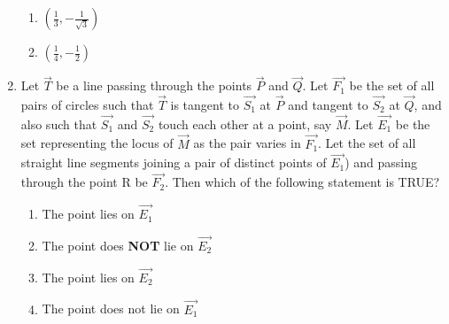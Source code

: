 \documentclass[journal,12pt,twocolumn]{IEEEtran}
\theoremstyle{remark}
\begin{document}
\begin{enumerate}
\begin{enumerate}[label=(\alph*)]
\item $\left(\frac{1}{3}, -\frac{1}{\sqrt{3}} \right)$
\item $\left(\frac{1}{4}, -\frac{1}{2}\right)$
\end{enumerate}
\item Let $\vec{T}$ be a line passing through the points $\vec{P}$ and $\vec{Q}$. Let $\vec{F_1}$ be the set of all pairs of circles  such that $\vec{T}$ is tangent to $\vec{S_1}$ at $\vec{P}$ and tangent to $\vec{S_2}$ at $\vec{Q}$, and also such that $\vec{S_1}$ and $\vec{S_2}$ touch each other at a point, say $\vec{M}$. Let $\vec{E_1}$ be the set representing the locus of $\vec{M}$ as the pair  varies in $\vec{F_1}$. Let the set of all straight line segments joining a pair of distinct points of $\vec{E_1}$) and passing through the point R be $\vec{F_2}$. Then which of the following statement is  TRUE?
\hfill{}
\begin{enumerate}
\item The point  lies on $\vec{E_1}$
\item The point  does \textbf{NOT} lie on $\vec{E_2}$
\item The point  lies on $\vec{E_2}$
\item The point  does not lie on $\vec{E_1}$
\end{enumerate}
\end{enumerate}
\end{document}
